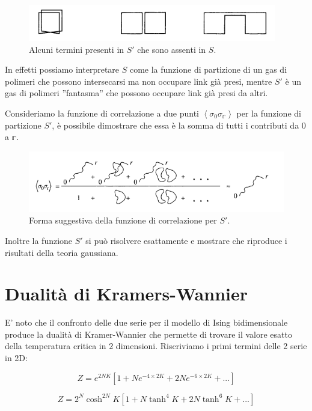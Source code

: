\documentclass[12pt,a4paper]{article}
\begin{document}
\begin{figure}[!htb]
\centering
\includegraphics[scale=0.50]{termini.png}
\caption{Alcuni termini presenti in $S'$ che sono assenti in $S$.\label{fig:termini}}
\end{figure}

In effetti possiamo interpretare $S$ come la funzione di partizione di un gas di polimeri che possono intersecarsi ma non occupare link già presi, mentre $S'$ è un gas di polimeri ''fantasma'' che possono occupare link già presi da altri.

Consideriamo la funzione di correlazione a due punti $\left< \sigma_0 \sigma_{\mathbb{r}} \right>$ per la funzione di partizione $S'$, è possibile dimostrare che essa è la somma di tutti i contributi da 0 a $\mathbb{r}$.

\begin{figure}[!htb]
\centering
\includegraphics[scale=0.60]{corr.png}
\caption{Forma suggestiva della funzione di correlazione per $S'$.\label{fig:corr}}
\end{figure}

Inoltre la funzione $S'$ si può risolvere esattamente e mostrare che riproduce i risultati della teoria gaussiana. 

\section{Dualità di Kramers-Wannier}

E' noto che il confronto delle due serie per il modello di Ising bidimensionale produce la dualità di Kramer-Wannier che permette di trovare il valore esatto della temperatura critica in 2 dimensioni. Riscriviamo i primi termini delle 2 serie in 2D:

\[
Z = e^{2 N K} \left[ 1+ N e^{-4 \times 2 K} + 2 N e^{-6 \times 2K} + ...\right] 
\]

\[
Z = 2^N \cosh^{2N} K \left[ 1 + N \tanh^4 K + 2 N \tanh^6 K + ... \right]
\]
\end{document}
